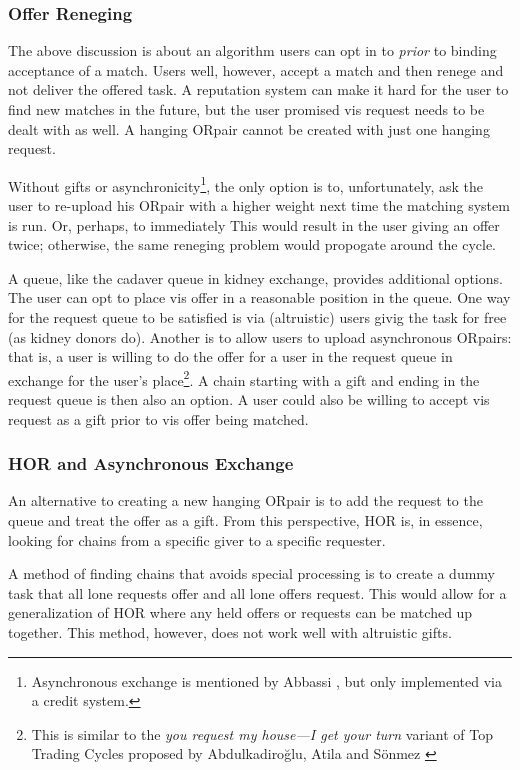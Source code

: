 \documentclass[main.tex]{subfiles}
\begin{document}
\subsubsection{Offer Reneging}
The above discussion is about an algorithm users can opt in to \textit{prior} to binding acceptance of a match. Users well, however, accept a match and then renege and not deliver the offered task. A reputation system can make it hard for the user to find new matches in the future, but the user promised vis request needs to be dealt with as well. A hanging ORpair cannot be created with just one hanging request.

Without gifts or asynchronicity\footnote{Asynchronous exchange is mentioned by Abbassi \cite{Abb2}, but only implemented via a credit system.}, the only option is to, unfortunately, ask the user to re-upload his ORpair with a higher weight next time the matching system is run. Or, perhaps, to immediately  This would result in the user giving an offer twice; otherwise, the same reneging problem would propogate around the cycle.

A queue, like the cadaver queue in kidney exchange, provides additional options. The user can opt to place vis offer in a reasonable position in the queue. One way for the request queue to be satisfied is via (altruistic) users givig the task for free (as kidney donors do). Another is to allow users to upload asynchronous ORpairs: that is, a user is willing to do the offer for a user in the request queue in exchange for the user's place\footnote{This is similar to the \textit{you request
my house—I get your turn} variant of Top Trading Cycles proposed by Abdulkadiro{\u{g}}lu, Atila and S{\"o}nmez \cite{abd1}}. A chain starting with a gift and ending in the request queue is then also an option. A user could also be willing to accept vis request as a gift prior to vis offer being matched.

\subsubsection{HOR and Asynchronous Exchange}
An alternative to creating a new hanging ORpair is to add the request to the queue and treat the offer as a gift. From this perspective, HOR is, in essence, looking for chains from a specific giver to a specific requester.

A method of finding chains that avoids special processing is to create a dummy task that all lone requests offer and all lone offers request. This would allow for a generalization of HOR where any held offers or requests can be matched up together. This method, however, does not work well with altruistic gifts.
\end{document}
